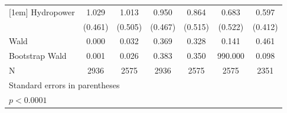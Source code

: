 \begin{table}[htbp]
\begin{tabular}{l*{6}{c}}
[1em]
Hydropower          &       1.029       &       1.013       &       0.950       &       0.864       &       0.683       &       0.597       \\
                    &     (0.461)       &     (0.505)       &     (0.467)       &     (0.515)       &     (0.522)       &     (0.412)       \\
\hline
Wald                &       0.000       &       0.032       &       0.369       &       0.328       &       0.141       &       0.461       \\
Bootstrap Wald      &       0.001       &       0.026       &       0.383       &       0.350       &     990.000       &       0.098       \\
N                   &        2936       &        2575       &        2936       &        2575       &        2575       &        2351       \\
\hline\hline
\multicolumn{7}{l}{\footnotesize Standard errors in parentheses}\\
\multicolumn{7}{l}{\footnotesize \sym{*} \(p<0.0001\)}\\
\end{tabular}
\end{table}

